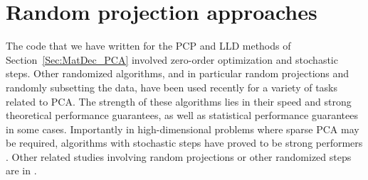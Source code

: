 \documentclass[ss]{imsart}
\theoremstyle{Example}
\begin{document}
\section{Random projection approaches}
\label{Sec:RanProj_PCA}
The code that we have written for the PCP and LLD methods of Section~\ref{Sec:MatDec_PCA} involved zero-order optimization and stochastic steps. Other randomized algorithms, and in particular random projections and randomly subsetting the data, have been used recently for a variety of tasks related to PCA. The strength of these algorithms lies in their speed and strong theoretical performance guarantees, as well as statistical performance guarantees in some cases. Importantly in high-dimensional problems where sparse PCA may be required, algorithms with stochastic steps have proved to be strong performers \cite{ref:JRSSB20329_PCA_Samworth, ref:Arxiv1712.05630_PCA_Samworth}. Other related studies involving random projections or other randomized steps are in \cite{kaloorazi2016switched, ref:IEEETransactionsOnImageProcessing092230_PCA, qi2012invariance, ref:ICML141341_PCA, mu2011accelerated, ref:ICML11xx_PCA, fischler1981random, ref:JRSSB17959_Samworth, ref:IEEETransactionsOnIT116256_RMT, ref:JAppliedRemoteSensing18015015_PCA, ref:EJS183673_PCA, ref:SIAMJAPPMath20977_Kutz_SPCA}. 

\end{document}
